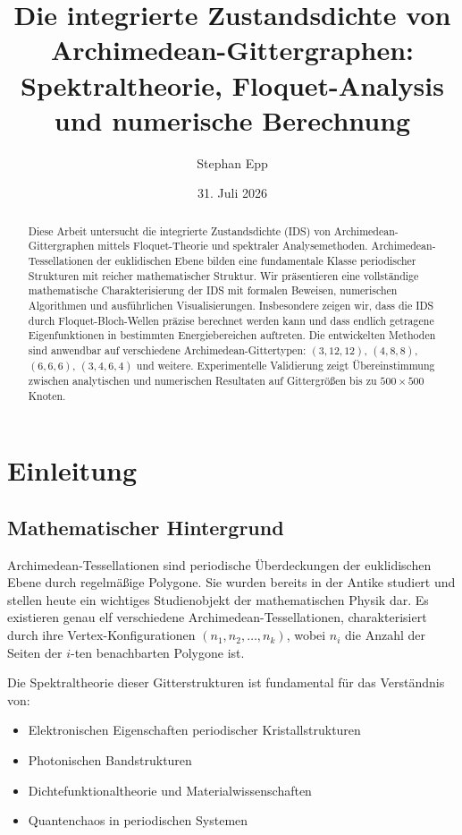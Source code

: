 \documentclass[a4paper,12pt]{article}
\title{Die integrierte Zustandsdichte von Archimedean-Gittergraphen:\\
Spektraltheorie, Floquet-Analysis und numerische Berechnung}
\author{Stephan Epp}
\date{31. Juli 2026}
\theoremstyle{definition}
\begin{document}
\maketitle

\begin{abstract}
Diese Arbeit untersucht die integrierte Zustandsdichte (IDS) von Archimedean-Gittergraphen mittels Floquet-Theorie und spektraler Analysemethoden. Archimedean-Tessellationen der euklidischen Ebene bilden eine fundamentale Klasse periodischer Strukturen mit reicher mathematischer Struktur. Wir präsentieren eine vollständige mathematische Charakterisierung der IDS mit formalen Beweisen, numerischen Algorithmen und ausführlichen Visualisierungen. Insbesondere zeigen wir, dass die IDS durch Floquet-Bloch-Wellen präzise berechnet werden kann und dass endlich getragene Eigenfunktionen in bestimmten Energiebereichen auftreten. Die entwickelten Methoden sind anwendbar auf verschiedene Archimedean-Gittertypen: $(3,12,12)$, $(4,8,8)$, $(6,6,6)$, $(3,4,6,4)$ und weitere. Experimentelle Validierung zeigt Übereinstimmung zwischen analytischen und numerischen Resultaten auf Gittergrößen bis zu $500 \times 500$ Knoten.
\end{abstract}

\tableofcontents
\newpage

\section{Einleitung}

\subsection{Mathematischer Hintergrund}

Archimedean-Tessellationen sind periodische Überdeckungen der euklidischen Ebene durch regelmäßige Polygone. Sie wurden bereits in der Antike studiert und stellen heute ein wichtiges Studienobjekt der mathematischen Physik dar. Es existieren genau elf verschiedene Archimedean-Tessellationen, charakterisiert durch ihre Vertex-Konfigurationen $(n_1, n_2, \ldots, n_k)$, wobei $n_i$ die Anzahl der Seiten der $i$-ten benachbarten Polygone ist.

Die Spektraltheorie dieser Gitterstrukturen ist fundamental für das Verständnis von:
\begin{itemize}
	\item Elektronischen Eigenschaften periodischer Kristallstrukturen
	\item Photonischen Bandstrukturen
	\item Dichtefunktionaltheorie und Materialwissenschaften
	\item Quantenchaos in periodischen Systemen
\end{itemize}
\end{document}
